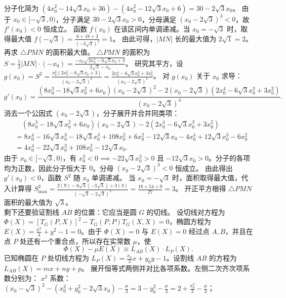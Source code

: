 \begin{solution}
\begin{align*}
\end{align*}
分子化简为 $(4x_0^2 - 14\sqrt{3}x_0 + 36) - (4x_0^2 - 12\sqrt{3}x_0 + 6) = 30 - 2\sqrt{3}x_0$。
由于 $x_0 \in [-\sqrt{3}, 0)$，分子满足 $30 - 2\sqrt{3}x_0 > 0$，分母满足 $(x_0 - 2\sqrt{3})^3 < 0$，故 $f'(x_0) < 0$ 恒成立。
函数 $f(x_0)$ 在该区间内单调递减。当 $x_0 = -\sqrt{3}$ 时，取得最大值 $f(-\sqrt{3}) = \frac{6 + 18 + 3}{(-3\sqrt{3})^2} = 1$。
由此可得，$|MN|$ 长的最大值为 $2\sqrt{1} = 2$。\\
再求 $\triangle PMN$ 的面积最大值。
$\triangle PMN$ 的面积为 $S = \frac{1}{2} |MN| \cdot (-x_0) = \frac{-x_0 \sqrt{2x_0^2 - 6\sqrt{3}x_0 + 3}}{2\sqrt{3} - x_0}$。
研究其平方，设 $g(x_0) = S^2 = \frac{x_0^2 (2x_0^2 - 6\sqrt{3}x_0 + 3)}{(x_0 - 2\sqrt{3})^2} = \frac{2x_0^4 - 6\sqrt{3}x_0^3 + 3x_0^2}{(x_0 - 2\sqrt{3})^2}$。
对 $g(x_0)$ 关于 $x_0$ 求导：
\[ g'(x_0) = \frac{(8x_0^3 - 18\sqrt{3}x_0^2 + 6x_0)(x_0 - 2\sqrt{3})^2 - 2(x_0 - 2\sqrt{3})(2x_0^4 - 6\sqrt{3}x_0^3 + 3x_0^2)}{(x_0 - 2\sqrt{3})^4}. \]
消去一个公因式 $(x_0 - 2\sqrt{3})$，分子展开并合并同类项：
\begin{align*}
&\quad (8x_0^3 - 18\sqrt{3}x_0^2 + 6x_0)(x_0 - 2\sqrt{3}) - 2(2x_0^4 - 6\sqrt{3}x_0^3 + 3x_0^2) \\
&= 8x_0^4 - 16\sqrt{3}x_0^3 - 18\sqrt{3}x_0^3 + 108x_0^2 + 6x_0^2 - 12\sqrt{3}x_0 - 4x_0^4 + 12\sqrt{3}x_0^3 - 6x_0^2 \\
&= 4x_0^4 - 22\sqrt{3}x_0^3 + 108x_0^2 - 12\sqrt{3}x_0.
\end{align*}
由于 $x_0 \in [-\sqrt{3}, 0)$，有 $x_0^3 < 0 \implies -22\sqrt{3}x_0^3 > 0$ 且 $-12\sqrt{3}x_0 > 0$。分子的各项均为正数，因此分子恒大于 $0$。分母 $(x_0 - 2\sqrt{3})^3 < 0$ 恒成立。
由此得出 $g'(x_0) < 0$，函数 $S^2$ 随 $x_0$ 单调递减。
当 $x_0 = -\sqrt{3}$ 时，面积取得最大值，代入计算得 $S_{\max}^2 = \frac{2(9) - 6\sqrt{3}(-3\sqrt{3}) + 3(3)}{(-\sqrt{3} - 2\sqrt{3})^2} = \frac{18 + 54 + 9}{27} = 3$。
开正平方根得 $\triangle PMN$ 面积的最大值为 $\sqrt{3}$。\\
剩下还要验证割线 $AB$ 的位置：它应当是圆 $G$ 的切线。
设切线对方程为 $\Phi(X) = [T_G(P, X)]^2 - T_G(P, P)T_G(X, X) = 0$，椭圆方程为 $E(X) = \frac{x^2}{3} + y^2 - 1 = 0$。由于 $\Phi(X) = 0$ 与 $E(X) = 0$ 经过点 $A, B$，并且在点 $P$ 处还有一个重合点，所以存在实常数 $\mu$，使
\[ \Phi(X) - \mu E(X) \equiv L_{AB}(X) \cdot L_P(X). \]
已知椭圆在 $P$ 处切线方程为 $L_P(X) = \frac{x_0}{3}x + y_0 y - 1$。设割线 $AB$ 的方程为 $L_{AB}(X) = mx + ny + p$。
展开恒等式两侧并对比各项系数。左侧二次齐次项系数分别为：
$x^2$ 系数：$(x_0 - \sqrt{3})^2 - (x_0^2 + y_0^2 - 2\sqrt{3}x_0) - \frac{\mu}{3} = 3 - y_0^2 - \frac{\mu}{3} = 2 + \frac{x_0^2}{3} - \frac{\mu}{3}$；

\end{solution}
